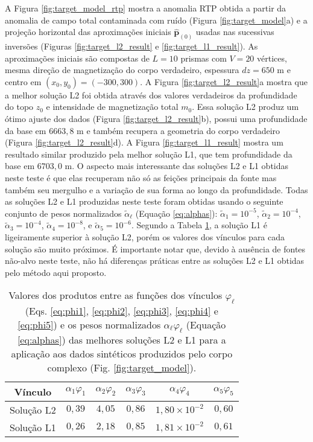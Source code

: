 A Figura \ref{fig:target_model_rtp} mostra a anomalia RTP obtida a partir da anomalia de campo total contaminada com ruído (Figura \ref{fig:target_model}a) e 
a projeção horizontal das aproximações iniciais $\hat{\mathbf{p}}_{(0)}$ 
usadas nas sucessivas inversões (Figuras \ref{fig:target_l2_result} e 
\ref{fig:target_l1_result}).
As aproximações iniciais são compostas de $ L= 10$ prismas com $ V = 20 $ vértices, mesma direção de magnetização do corpo verdadeiro, espessura $ dz=650 $ m e centro em $ (x_0, y_0) = (-300, 300) $.
A Figura \ref{fig:target_l2_result}a mostra que a melhor solução L2 foi obtida através dos valores verdadeiros da profundidade do topo $z_{0}$ e intensidade de magnetização total $m_{0}$. Essa solução L2 produz um ótimo ajuste dos dados (Figura \ref{fig:target_l2_result}b), possui uma profundidade da base em $6663,8$ m e também recupera a geometria do corpo verdadeiro (Figura \ref{fig:target_l2_result}d).
A Figura \ref{fig:target_l1_result} mostra um resultado similar produzido pela melhor solução L1, que tem profundidade da base em $6703,0$ m.
O aspecto mais interessante das soluções L2 e L1 obtidas neste teste é que elas recuperam não só as feições principais da fonte mas também seu mergulho e a variação de sua forma ao longo da profundidade.
Todas as soluções L2 e L1 produzidas neste teste foram obtidas usando o seguinte conjunto de pesos normalizados $\tilde{\alpha}_{\ell}$ (Equação \ref{eq:alphas}): 
$\tilde{\alpha}_{1} = 10^{-5}$, $\tilde{\alpha}_{2} = 10^{-4}$, 
$\tilde{\alpha}_{3} = 10^{-4}$, $\tilde{\alpha}_{4} = 10^{-8}$, e 
$\tilde{\alpha}_{5} = 10^{-6}$. 
Segundo a Tabela \ref{tab:complex}, a solução L1 é ligeiramente superior à solução L2, porém os valores dos vínculos para cada solução são muito próximos.
É importante notar que, devido à ausência de fontes não-alvo neste teste, não há diferenças práticas entre as soluções L2 e L1 obtidas pelo método aqui proposto.


\begin{table}[h]\label{tab:complex}
	\caption{Valores dos produtos entre as funções dos vínculos $ \varphi_{\ell} $ (Eqs. \ref{eq:phi1}, \ref{eq:phi2}, \ref{eq:phi3}, \ref{eq:phi4} e \ref{eq:phi5}) e os pesos normalizados $ \alpha_\ell \varphi_\ell  $ (Equação \ref{eq:alphas}) das melhores soluções L2 e L1 para a aplicação aos dados sintéticos produzidos pelo corpo complexo (Fig. \ref{fig:target_model}).}
	\centering
	\vspace{0.5cm}
	\begin{tabular}{c|ccccc}
		Vínculo & $ \alpha_{1}\varphi _1 $ & $ \alpha_{2}\varphi _2 $ &  $ \alpha_{3}\varphi _3 $ &  $ \alpha_{4}\varphi _4 $ &  $ \alpha_{5}\varphi _5 $ \\
		\hline
		Solução L2 & $ 0,39 $ & $ 4,05 $ & $ 0,86 $ & $1,80 \times 10^{-2} $ & $ 0,60 $ \\ 
		Solução L1 & $ 0,26 $ & $ 2,18 $ & $ 0,85 $ & $1,81 \times 10^{-2} $ & $ 0,61 $
	\end{tabular}
\end{table}


